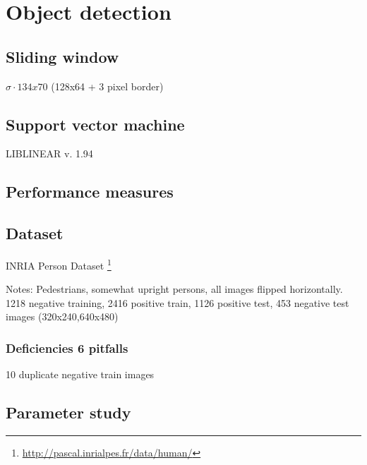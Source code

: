 \documentclass[thesis.tex]{subfiles}
\begin{document}
\chapter{Object detection}
\label{sec:od}

\section{Sliding window}

$\sigma \cdot 134x70$ (128x64 + 3 pixel border)

\section{Support vector machine}

LIBLINEAR v. 1.94 \cite{fan2008liblinear}


\section{Performance measures}

\section{Dataset}
\label{sec:odDataset}

INRIA Person Dataset \footnote{\url{http://pascal.inrialpes.fr/data/human/}} \cite{dalal2005histograms}

Notes: Pedestrians, somewhat upright persons, all images flipped horizontally.
1218 negative training, 2416 positive train, 1126 positive test, 453 negative test images (320x240,640x480)

\subsection{Deficiencies 6 pitfalls}
10 duplicate negative train images

\section{Parameter study}
\label{sec:odParameterStudy}

\subbibliography
\end{document}
